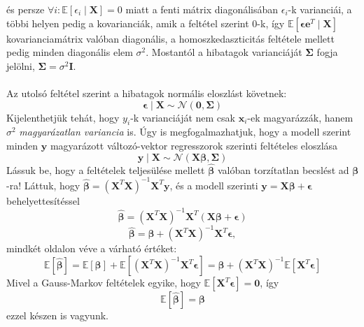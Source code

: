 \documentclass[14p]{report}
\def\pmb{\boldsymbol}
\def\ebeta{\hat{\pmb{\beta}}}
\def\e{\epsilon}
\begin{document}
és persze $\forall i : \mathbb{E}[\e_i \mid \pmb{X}] = 0$ miatt a fenti mátrix diagonálisában $\e_i$-k varianciái, a többi helyen pedig a kovarianciák, amik a feltétel szerint $0$-k, így $\mathbb{E}[\pmb{\e}\pmb{e}^T \mid \pmb{X}]$ kovarianciamátrix valóban diagonális, a homoszkedaszticitás feltétele mellett pedig minden diagonális elem $\sigma^2$. Mostantól a hibatagok varianciáját $\pmb{\Sigma}$ fogja jelölni, $\pmb{\Sigma} = \sigma^2\pmb{I}$.
\\
\\
Az utolsó feltétel szerint a hibatagok normális eloszlást követnek:
\[
	\pmb{\e} \mid \pmb{X} \sim \mathcal{N}(\pmb{0}, \pmb{\Sigma})
\]
Kijelenthetjük tehát, hogy $y_i$-k varianciáját nem csak $\pmb{x}_i$-ek magyarázzák, hanem $\sigma^2$ \emph{magyarázatlan variancia} is. Úgy is megfogalmazhatjuk, hogy a modell szerint minden $\pmb{y}$ magyarázott változó-vektor regresszorok szerinti feltételes eloszlása
\[
	\pmb{y} \mid \pmb{X} \sim \mathcal{N}(\pmb{X}\pmb{\beta}, \pmb{\Sigma})
\]
Lássuk be, hogy a feltételek teljesülése mellett $\ebeta$ valóban torzítatlan becslést ad $\pmb{\beta}$-ra! Láttuk, hogy $\ebeta = (\pmb{X}^T\pmb{X})^{-1}\pmb{X}^T\pmb{y}$, és a modell szerinti $\pmb{y} = \pmb{X}\pmb{\beta} + \pmb{\e}$ behelyettesítéssel
\[
	\ebeta = (\pmb{X}^T\pmb{X})^{-1}\pmb{X}^T(\pmb{X}\pmb{\beta} + \pmb{\e})
\]
\[
	\ebeta = \pmb{\beta} + (\pmb{X}^T\pmb{X})^{-1}\pmb{X}^T\pmb{\e},
\]
mindkét oldalon véve a várható értéket:
\[
	\mathbb{E}[\ebeta] = \mathbb{E}[\pmb{\beta}] + \mathbb{E}[(\pmb{X}^T\pmb{X})^{-1}\pmb{X}^T\pmb{\e}] = \pmb{\beta} + (\pmb{X}^T\pmb{X})^{-1}\mathbb{E}[\pmb{X}^T\pmb{\e}]
\]
Mivel a Gauss-Markov feltételek egyike, hogy $\mathbb{E}[\pmb{X}^T\pmb{\e}] = \pmb{0}$, így
\[
	\mathbb{E}[\ebeta] = \pmb{\beta}
\]
ezzel készen is vagyunk.
\end{document}

